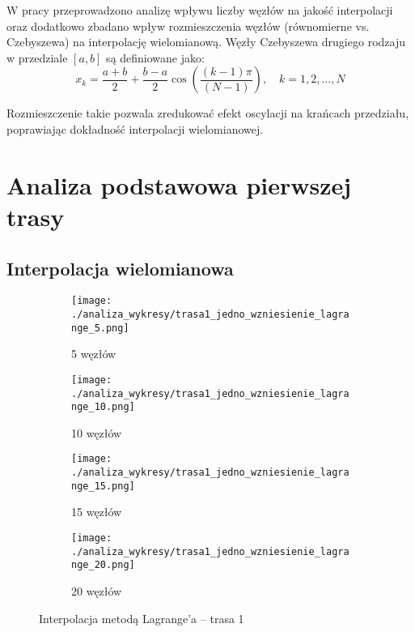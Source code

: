 \documentclass[a4paper,12pt]{article}
\begin{document}
W pracy przeprowadzono analizę wpływu liczby węzłów na jakość interpolacji oraz dodatkowo zbadano wpływ rozmieszczenia węzłów (równomierne vs. Czebyszewa) na interpolację wielomianową. Węzły Czebyszewa drugiego rodzaju w przedziale $[a, b]$ są definiowane jako:
\begin{equation}
x_k = \frac{a + b}{2} + \frac{b - a}{2} \cos\left( \frac{(k - 1)\pi}{(N - 1)} \right), \quad k = 1, 2, \dots, N
\end{equation}

Rozmieszczenie takie pozwala zredukować efekt oscylacji na krańcach przedziału, poprawiając dokładność interpolacji wielomianowej.
\section{Analiza podstawowa pierwszej trasy}
\subsection{Interpolacja wielomianowa}
\begin{figure}[H]
    \centering
    \begin{subfigure}{0.45\textwidth}
        \texttt{[image: ./analiza\_wykresy/trasa1\_jedno\_wzniesienie\_lagrange\_5.png]}
        \caption{5 węzłów}
    \end{subfigure}
    \hfill
    \begin{subfigure}{0.45\textwidth}
        \texttt{[image: ./analiza\_wykresy/trasa1\_jedno\_wzniesienie\_lagrange\_10.png]}
        \caption{10 węzłów}
    \end{subfigure}
    
    \vspace{1em}
    
    \begin{subfigure}{0.45\textwidth}
        \texttt{[image: ./analiza\_wykresy/trasa1\_jedno\_wzniesienie\_lagrange\_15.png]}
        \caption{15 węzłów}
    \end{subfigure}
    \hfill
    \begin{subfigure}{0.45\textwidth}
        \texttt{[image: ./analiza\_wykresy/trasa1\_jedno\_wzniesienie\_lagrange\_20.png]}
        \caption{20 węzłów}
    \end{subfigure}
    
    \caption{Interpolacja metodą Lagrange’a – trasa 1}
\end{figure}
\end{document}
